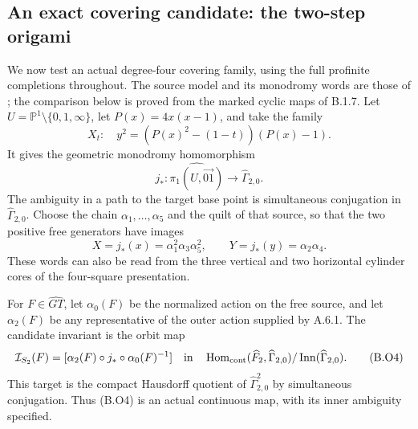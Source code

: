 \subsection{An exact covering candidate: the two-step origami}
\label{sec:origami-covariance}

We now test an actual degree-four covering family, using the
full profinite completions throughout. The source model and its
monodromy words are those of
\cite[Proposition 4.2 and \S7.2]{Moeller2005}; the comparison
below is proved from the marked cyclic maps of B.1.7.
Let \(U=\mathbb P^1\setminus\{0,1,\infty\}\), let
\(P(x)=4x(x-1)\), and take the family
\[
 X_t:\quad y^2=(P(x)^2-(1-t))(P(x)-1).
                                                        \tag{B.O1}
\]
It gives the geometric monodromy homomorphism
\[
 j_*:\widehat{\pi_1(U,\overrightarrow{01})}
             \longrightarrow\widehat\Gamma_{2,0}.
                                                        \tag{B.O2}
\]
The ambiguity in a path to the target base point is simultaneous
conjugation in \(\widehat\Gamma_{2,0}\). Choose the chain
\(\alpha_1,\ldots,\alpha_5\) and the quilt of that source,
so that the two positive free generators have images
\[
 X=j_*(x)=\alpha_1^2\alpha_3\alpha_5^2,
 \qquad Y=j_*(y)=\alpha_2\alpha_4.                       \tag{B.O3}
\]
These words can also be read from the three vertical and two
horizontal cylinder cores of the four-square presentation.

For \(F\in\widehat{GT}\), let \(\alpha_0(F)\) be the
normalized action on the free source, and let \(\alpha_2(F)\)
be any representative of the outer action supplied by A.6.1.
The candidate invariant is the orbit map
\[
 \mathcal I_{S_2}(F)=
 [\alpha_2(F)\circ j_*\circ\alpha_0(F)^{-1}]
 \quad\text{in}\quad
 \operatorname{Hom}_{\rm cont}(\widehat F_2,
               \widehat\Gamma_{2,0})/
               \operatorname{Inn}(\widehat\Gamma_{2,0}).
                                                        \tag{B.O4}
\]
This target is the compact Hausdorff quotient of
\(\widehat\Gamma_{2,0}^2\) by simultaneous conjugation.
Thus (B.O4) is an actual continuous map, with its inner
ambiguity specified.

